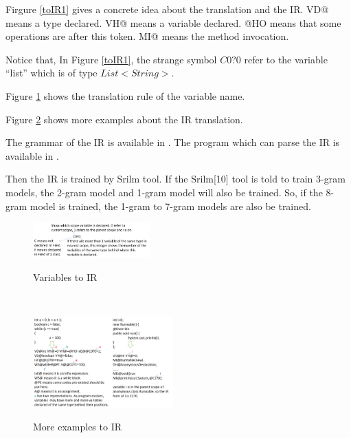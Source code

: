 \documentclass{sig-alternate-05-2015}
\begin{document}
Firgure \ref{toIR1} gives a concrete idea about the translation and the IR. VD@ means a type declared. VH@ means a variable declared.
@HO means that some operations are after this token. MI@ means the method invocation.

Notice that, In Figure \ref{toIR1}, the strange symbol $C0?0$ refer to the variable ``list'' which is of type $List<String>$.

Figure \ref{vartoIR1} shows the translation rule of the variable name.

Figure \ref{moretoIR} shows more examples about the IR translation.


The grammar of the IR is available in \cite{irgrammar}. The program which can parse the IR is available in \cite{irparser}.

Then the IR is trained by Srilm\cite{stolcke2011srilm} tool. If the Srilm[10]
tool is told to train 3-gram models, the 2-gram model and 1-gram model will also be trained. So, if the 8-gram model is trained, the 1-gram to 7-gram models are also be trained.
\vspace{-0.4cm}
\\\begin{figure}[htbp]
  \centering
  \includegraphics[width=0.4\textwidth]{pics/variableIR.png}\\
  \vspace{-0.1cm}
  \caption{Variables to IR}\label{vartoIR1}
\end{figure}
\vspace{-0.4cm}
\\\begin{figure}[htbp]
  \centering
  \includegraphics[width=0.48\textwidth]{pics/moreexamplesIR.png}\\
  \vspace{-0.1cm}
  \caption{More examples to IR}\label{moretoIR}
\end{figure}
\end{document}
